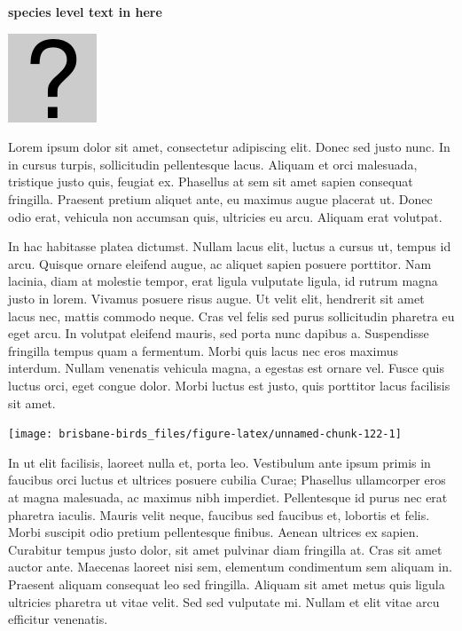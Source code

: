 \documentclass[]{book}
\let\origfigure\figure
\let\endorigfigure\endfigure
\renewenvironment{figure}[1][2] {
  \expandafter\origfigure\expandafter[H]
} {
  \endorigfigure
}
\begin{document}
\textbf{species level text in here}

\begin{figure}
\centering
\includegraphics{assets/missing.png}
\caption{No image for species}
\end{figure}

Lorem ipsum dolor sit amet, consectetur adipiscing elit. Donec sed justo
nunc. In in cursus turpis, sollicitudin pellentesque lacus. Aliquam et
orci malesuada, tristique justo quis, feugiat ex. Phasellus at sem sit
amet sapien consequat fringilla. Praesent pretium aliquet ante, eu
maximus augue placerat ut. Donec odio erat, vehicula non accumsan quis,
ultricies eu arcu. Aliquam erat volutpat.

In hac habitasse platea dictumst. Nullam lacus elit, luctus a cursus ut,
tempus id arcu. Quisque ornare eleifend augue, ac aliquet sapien posuere
porttitor. Nam lacinia, diam at molestie tempor, erat ligula vulputate
ligula, id rutrum magna justo in lorem. Vivamus posuere risus augue. Ut
velit elit, hendrerit sit amet lacus nec, mattis commodo neque. Cras vel
felis sed purus sollicitudin pharetra eu eget arcu. In volutpat eleifend
mauris, sed porta nunc dapibus a. Suspendisse fringilla tempus quam a
fermentum. Morbi quis lacus nec eros maximus interdum. Nullam venenatis
vehicula magna, a egestas est ornare vel. Fusce quis luctus orci, eget
congue dolor. Morbi luctus est justo, quis porttitor lacus facilisis sit
amet.

\begin{figure}
\texttt{[image: brisbane-birds\_files/figure-latex/unnamed-chunk-122-1]} \caption{insert figure caption}\label{fig:unnamed-chunk-122}
\end{figure}

In ut elit facilisis, laoreet nulla et, porta leo. Vestibulum ante ipsum
primis in faucibus orci luctus et ultrices posuere cubilia Curae;
Phasellus ullamcorper eros at magna malesuada, ac maximus nibh
imperdiet. Pellentesque id purus nec erat pharetra iaculis. Mauris velit
neque, faucibus sed faucibus et, lobortis et felis. Morbi suscipit odio
pretium pellentesque finibus. Aenean ultrices ex sapien. Curabitur
tempus justo dolor, sit amet pulvinar diam fringilla at. Cras sit amet
auctor ante. Maecenas laoreet nisi sem, elementum condimentum sem
aliquam in. Praesent aliquam consequat leo sed fringilla. Aliquam sit
amet metus quis ligula ultricies pharetra ut vitae velit. Sed sed
vulputate mi. Nullam et elit vitae arcu efficitur venenatis.
\end{document}

